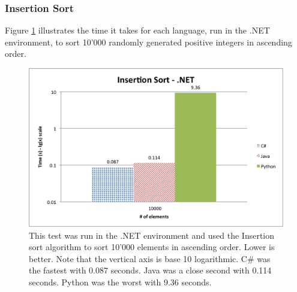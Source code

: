\subsubsection{Insertion Sort}

Figure \ref{fig:net_insertion_sort} illustrates the time it takes for each language, run in the .NET environment, to sort 10'000 randomly generated positive integers in ascending order.

\begin{figure}[h]
	\centering
	\includegraphics[width=1.0\linewidth]{chapters/new_media/InsertionSortNet.png}
	\caption{This test was run in the .NET environment and used the Insertion sort algorithm to sort 10'000 elements in ascending order. Lower is better. Note that the vertical axis is base 10 logarithmic. C\# was the fastest with 0.087 seconds. Java was a close second with 0.114 seconds. Python was the worst with 9.36 seconds.}
	\label{fig:net_insertion_sort}
\end{figure}
